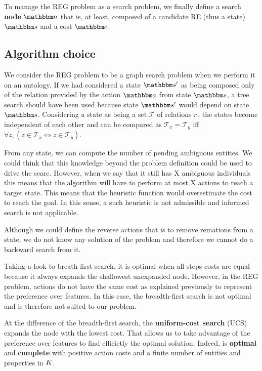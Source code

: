 To manage the REG problem as a search problem, we finally define a search \textbf{node} $\node$ that is, at least, composed of a candidate RE (thus a state) $\state$ and a cost $\cost$.

\subsection{Algorithm choice}

We consider the REG problem to be a graph search problem when we perform it on an ontology. If we had considered a state $\state'$ as being composed only of the relation provided by the action $\action$ from state $\state$, a tree search should have been used because state $\state'$ would depend on state $\state$. Considering a state as being a set $\mathcal{T}$ of relations $r$, the states become independent of each other and can be compared as $\mathcal{T}_x = \mathcal{T}_y$ iff $\forall{z},(z\in \mathcal{T}_x \Leftrightarrow z\in \mathcal{T}_y)$.

From any state, we can compute the number of pending ambiguous entities. We could think that this knowledge beyond the problem definition could be used to drive the searc. However, when we say that it still has X ambiguous individuals this means that the algorithm will have to perform at most X actions to reach a target state. This means that the heuristic function would overestimate the cost to reach the goal. In this sense, a such heuristic is not admissible and informed search is not applicable.

Although we could define the reverse actions that is to remove remations from a state, we do not know any solution of the problem and therefore we cannot do a backward search from it.

Taking a look to breath-first search, it is optimal when all steps costs are equal because it always expands the shallowest unexpanded node. However, in the REG problem, actions do not have the same cost as explained previously to represent the preference over features. In this case, the breadth-first search is not optimal and is therefore not suited to our problem.

At the difference of the breadth-first search, the \textbf{uniform-cost search} (UCS) expands the node with the lowest cost. That allows us to take advantage of the preference over features to find efficietly the optimal solution. Indeed, is \textbf{optimal} and \textbf{complete} with positive action costs and a finite number of entities and properties in $K$.

